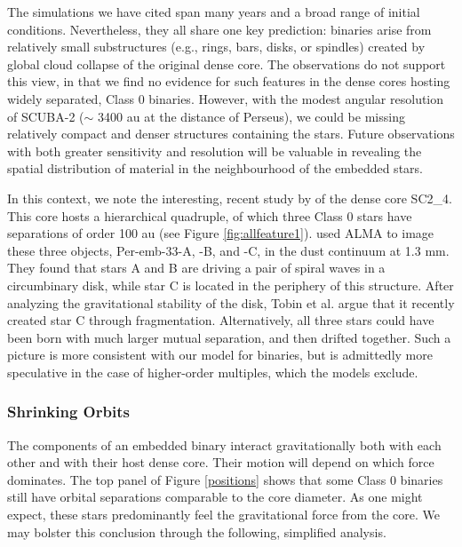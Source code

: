 \documentclass[usenatbib,a4paper]{mnras}
\begin{document}
The simulations we have cited span many years and a broad range of initial conditions.  Nevertheless, they all share one key prediction: binaries arise from relatively small substructures (e.g., rings, bars, disks, or spindles) created by global cloud collapse of the original  dense core.  The observations do not support this view, in that we find no evidence for such features in the dense cores hosting widely separated, Class 0 binaries.  However, with the modest angular resolution of SCUBA-2 ($\sim$ 3400 au at the distance of Perseus), we could be missing relatively compact and denser structures containing the stars.  Future observations with both greater sensitivity and resolution will be valuable in revealing the spatial distribution of material in the neighbourhood of the embedded stars.

In this context, we note the interesting, recent study by \citet{Tobin16l1448} of the dense core SC2\_4.  This core hosts a hierarchical quadruple, of which three Class 0 stars have separations of order 100 au (see Figure \ref{fig:allfeature1}).  \citet{Tobin16l1448} used ALMA to image these three objects, Per-emb-33-A, -B, and -C, in the dust continuum at 1.3 mm.  They found that stars A and B are driving a pair of spiral waves in a circumbinary disk, while star C is located in the periphery of this structure.  After analyzing the gravitational stability of the disk, Tobin et al. argue that it recently created star C through fragmentation.  Alternatively, all three stars could have been born with much larger mutual separation, and then drifted together. Such a picture is more consistent with our model for binaries, but is admittedly more speculative in the case of higher-order multiples, which the models exclude.


\subsubsection{Shrinking Orbits}\label{shrink}

The components of an embedded binary interact gravitationally both with each other and with their host dense core.  Their motion will depend on which force dominates. The top panel of Figure \ref{positions} shows that some Class 0 binaries still have orbital separations comparable to the core diameter. As one might expect, these stars predominantly feel the gravitational force from the core. We may bolster this conclusion through the following, simplified analysis.
\end{document}
